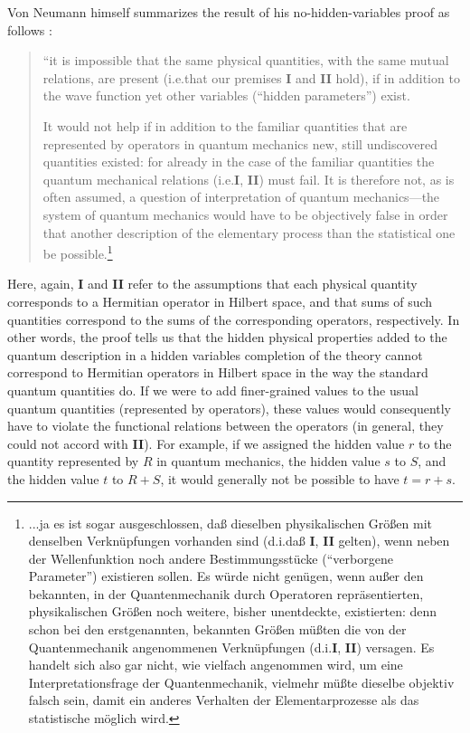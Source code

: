 \documentclass[11pt]{article}
\begin{document}
Von Neumann himself summarizes the result of his no-hidden-variables proof as follows \cite[p.\@ 171]{VN1}:
\begin{quote}
 ``it is impossible that the same physical quantities, with the same mutual relations, are present (i.e.\@ that our premises \textbf{I} and \textbf{II} hold), if in addition to the wave function yet other variables (``hidden parameters'') exist.

 It would not help if in addition to the familiar quantities that are represented by operators in quantum mechanics new, still undiscovered quantities existed: for already in the case of the familiar quantities the quantum mechanical relations (i.e.\@ \textbf{I}, \textbf{II}) must fail. It is therefore not, as is often assumed, a question of interpretation of quantum mechanics---the system of quantum mechanics would have to be objectively false in order that another description of the elementary process than the statistical one be possible.\footnote{...ja es ist sogar ausgeschlossen, da{\ss} dieselben physikalischen Gr\"{o}{\ss}en mit denselben Verkn\"{u}pfungen vorhanden sind (d.i.\@ da{\ss} \textbf{I}, \textbf{II} gelten), wenn neben der Wellenfunktion noch andere Bestimmungsst\"{u}cke (``verborgene Parameter'') existieren sollen. Es w\"{u}rde nicht gen\"{u}gen, wenn au{\ss}er den bekannten, in der Quantenmechanik durch Operatoren repr\"{a}sentierten, physikalischen Gr\"{o}{\ss}en noch weitere, bisher unentdeckte, existierten: denn schon bei den erstgenannten, bekannten Gr\"{o}{\ss}en m\"{u}{\ss}ten die von der Quantenmechanik angenommenen Verkn\"{u}pfungen (d.i.\@ \textbf{I}, \textbf{II}) versagen. Es handelt sich also gar nicht, wie vielfach angenommen wird, um eine Interpretationsfrage der Quantenmechanik, vielmehr m\"{u}{\ss}te dieselbe objektiv falsch sein, damit ein anderes Verhalten der Elementarprozesse als das statistische m\"{o}glich wird.}
\end{quote}
Here, again, \textbf{I} and \textbf{II} refer to the assumptions that each physical quantity corresponds to a Hermitian operator in Hilbert space, and that sums of such quantities correspond to the sums of the corresponding operators, respectively. In other words, the proof tells us that the hidden physical properties added to the quantum description in a hidden variables completion of the theory cannot correspond to Hermitian operators in Hilbert space in the way the standard quantum quantities do. If we were to add finer-grained values to the usual quantum quantities (represented by operators), these values would consequently have to violate the functional relations between the operators (in general, they could not accord with \textbf{II}). For example, if we assigned the hidden value $r$ to the quantity represented by $R$ in quantum mechanics, the hidden value $s$ to $S$, and the hidden value $t$ to $R + S$, it would generally not be possible to have $t = r + s$.
\end{document}
